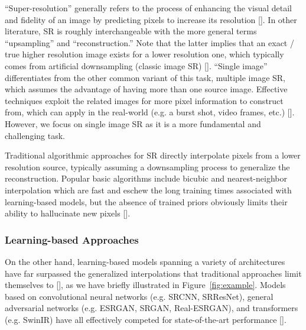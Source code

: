 \documentclass{article}
\begin{document}
“Super-resolution” generally refers to the process of enhancing the visual detail and fidelity of an image by predicting pixels to increase its resolution []. In other literature, SR is roughly interchangeable with the more general terms “upsampling” and “reconstruction.” Note that the latter implies that an exact / true higher resolution image exists for a lower resolution one, which typically comes from artificial downsampling (classic image SR) []. “Single image”  differentiates from the other common variant of this task, multiple image SR, which assumes the advantage of having more than one source image. Effective techniques exploit the related images for more pixel information to construct from, which can apply in the real-world (e.g. a burst shot, video frames, etc.) []. However, we focus on single image SR as it is a more fundamental and challenging task.

Traditional algorithmic approaches for SR directly interpolate pixels from a lower resolution source, typically assuming a downsampling process to generalize the reconstruction. Popular basic algorithms include bicubic and nearest-neighbor interpolation which are fast and eschew the long training times associated with learning-based models, but the absence of trained priors obviously limits their ability to hallucinate new pixels [].

\subsubsection{Learning-based Approaches}

On the other hand, learning-based models spanning a variety of architectures have far surpassed the generalized interpolations that traditional approaches limit themselves to [], as we have briefly illustrated in Figure~\ref{fig:example}. Models based on convolutional neural networks (e.g. SRCNN, SRResNet), general adversarial networks (e.g. ESRGAN, SRGAN, Real-ESRGAN), and transformers (e.g. SwinIR) have all effectively competed for state-of-the-art performance [].
\end{document}
